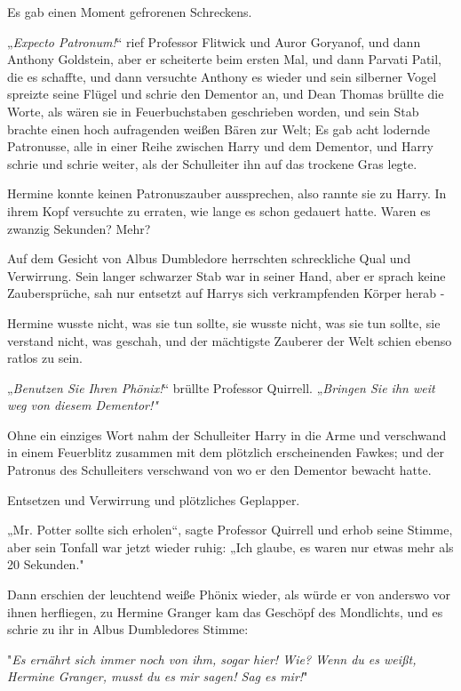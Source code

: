 {Es gab einen Moment gefrorenen Schreckens.

„\emph{Expecto Patronum!}“ rief Professor Flitwick und Auror Goryanof, und dann Anthony Goldstein, aber er scheiterte beim ersten Mal, und dann Parvati Patil, die es schaffte, und dann versuchte Anthony es wieder und sein silberner Vogel spreizte seine Flügel und schrie den Dementor an, und Dean Thomas brüllte die Worte, als wären sie in Feuerbuchstaben geschrieben worden, und sein Stab brachte einen hoch aufragenden weißen Bären zur Welt; Es gab acht lodernde Patronusse, alle in einer Reihe zwischen Harry und dem Dementor, und Harry schrie und schrie weiter, als der Schulleiter ihn auf das trockene Gras legte.

Hermine konnte keinen Patronuszauber aussprechen, also rannte sie zu Harry. In ihrem Kopf versuchte zu erraten, wie lange es schon gedauert hatte. Waren es zwanzig Sekunden? Mehr?

Auf dem Gesicht von Albus Dumbledore herrschten schreckliche Qual und Verwirrung. Sein langer schwarzer Stab war in seiner Hand, aber er sprach keine Zaubersprüche, sah nur entsetzt auf Harrys sich verkrampfenden Körper herab -

Hermine wusste nicht, was sie tun sollte, sie wusste nicht, was sie tun sollte, sie verstand nicht, was geschah, und der mächtigste Zauberer der Welt schien ebenso ratlos zu sein.

„\emph{Benutzen Sie Ihren Phönix!}“ brüllte Professor Quirrell. „\emph{Bringen Sie ihn weit weg von diesem Dementor!"}

Ohne ein einziges Wort nahm der Schulleiter Harry in die Arme und verschwand in einem Feuerblitz zusammen mit dem plötzlich erscheinenden Fawkes; und der Patronus des Schulleiters verschwand von wo er den Dementor bewacht hatte.

Entsetzen und Verwirrung und plötzliches Geplapper.

„Mr. Potter sollte sich erholen“, sagte Professor Quirrell und erhob seine Stimme, aber sein Tonfall war jetzt wieder ruhig: „Ich glaube, es waren nur etwas mehr als 20 Sekunden."

Dann erschien der leuchtend weiße Phönix wieder, als würde er von anderswo vor ihnen herfliegen, zu Hermine Granger kam das Geschöpf des Mondlichts, und es schrie zu ihr in Albus Dumbledores Stimme:

"\emph{Es ernährt sich immer noch von ihm, sogar hier! Wie? Wenn du es weißt, Hermine Granger, musst du es mir sagen! Sag es mir!}"

}
